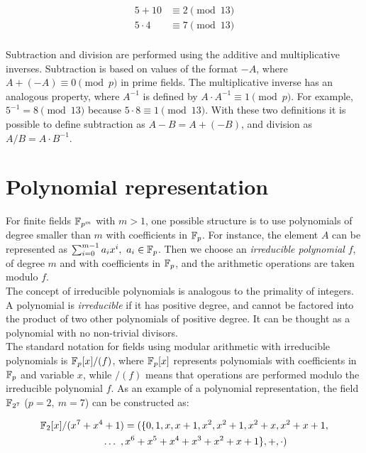 \begin{align*}
5 + 10 &\equiv 2 \pmod{13} \\
5 \cdot 4 &\equiv 7 \pmod{13} \\
\end{align*}

Subtraction and division are performed using the additive and multiplicative inverses. Subtraction is based on values of the format $-A$, where $A + (-A) \equiv 0 \pmod p$ in prime fields. The multiplicative inverse has an analogous property, where $A^{-1}$ is defined by $A \cdot A^{-1} \equiv 1 \pmod p$. For example, $5^{-1} = 8 \pmod{13}$ because $5 \cdot 8 \equiv 1 \pmod{13}$. With these two definitions it is possible to define subtraction as $A - B = A + (-B)$, and division as $A / B = A \cdot B^{-1}$.

\section{Polynomial representation} \label{background:polynomial_representation}

For finite fields $\mathbb{F}_{p^m}$ with $m > 1$, one possible structure is to use polynomials of degree smaller than $m$ with coefficients in $\mathbb{F}_{p}$. For instance, the element $A$ can be represented as $\sum_{i=0}^{m-1} a_i x^i,~a_i \in \mathbb{F}_{p}$. Then we choose an \emph{irreducible polynomial} $f$, of degree $m$ and with coefficients in $\mathbb{F}_{p}$, and the arithmetic operations are taken modulo $f$.\\

The concept of irreducible polynomials is analogous to the primality of integers. A polynomial is \emph{irreducible} if it has positive degree, and cannot be factored into the product of two other polynomials of positive degree. It can be thought as a polynomial with no non-trivial divisors.\\

The standard notation for fields using modular arithmetic with irreducible polynomials is $\mathbb{F}_p[x]/(f)$, where $\mathbb{F}_p[x]$ represents polynomials with coefficients in $\mathbb{F}_p$ and variable $x$, while $/(f)$ means that operations are performed modulo the irreducible polynomial $f$. As an example of a polynomial representation, the field $\mathbb{F}_{2^7}$ ($p=2,~m=7$) can be constructed as:

\begin{gather*}
\mathbb{F}_{2}[x]/(x^7+x^4+1) = (\{0, 1, x, x+1, x^2, x^2+1, x^2+x, x^2+x+1, \\
\hspace{8mm} \ldots~, x^6+x^5+x^4+x^3+x^2+x+1\}, +, \cdot)
\end{gather*}

